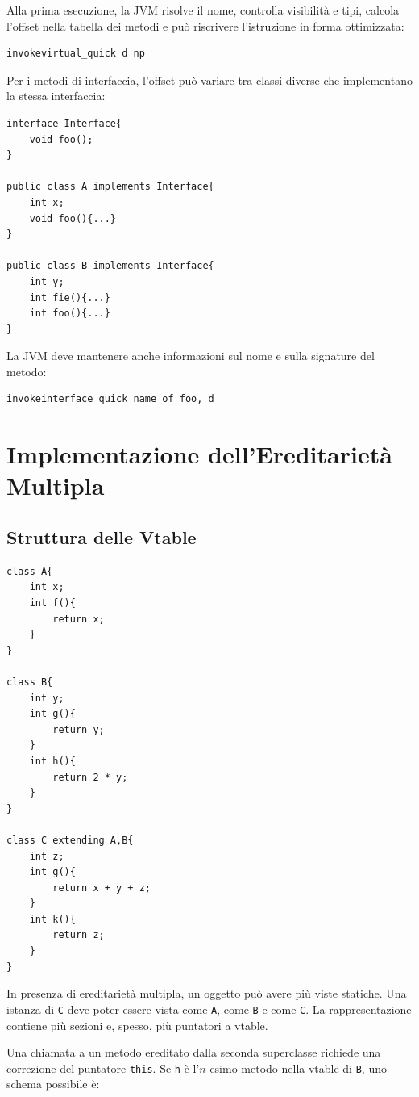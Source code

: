 \documentclass{article}
\begin{document}
Alla prima esecuzione, la JVM risolve il nome, controlla visibilità e tipi, calcola l'offset nella tabella dei metodi e può riscrivere l'istruzione in forma ottimizzata:

\begin{lstlisting}
invokevirtual_quick d np
\end{lstlisting}

Per i metodi di interfaccia, l'offset può variare tra classi diverse che implementano la stessa interfaccia:

\begin{lstlisting}
interface Interface{
    void foo();
}

public class A implements Interface{
    int x;
    void foo(){...}
}

public class B implements Interface{
    int y;
    int fie(){...}
    int foo(){...}
}
\end{lstlisting}

La JVM deve mantenere anche informazioni sul nome e sulla signature del metodo:

\begin{lstlisting}
invokeinterface_quick name_of_foo, d
\end{lstlisting}

\section{Implementazione dell'Ereditarietà Multipla}

\subsection{Struttura delle Vtable}

\begin{lstlisting}
class A{
    int x;
    int f(){
        return x;
    }
}

class B{
    int y;
    int g(){
        return y;
    }
    int h(){
        return 2 * y;
    }
}

class C extending A,B{
    int z;
    int g(){
        return x + y + z;
    }
    int k(){
        return z;
    }
}
\end{lstlisting}

In presenza di ereditarietà multipla, un oggetto può avere più viste statiche. Una istanza di \texttt{C} deve poter essere vista come \texttt{A}, come \texttt{B} e come \texttt{C}. La rappresentazione contiene più sezioni e, spesso, più puntatori a vtable.

Una chiamata a un metodo ereditato dalla seconda superclasse richiede una correzione del puntatore \texttt{this}. Se \texttt{h} è l'$n$-esimo metodo nella vtable di \texttt{B}, uno schema possibile è:
\end{document}
